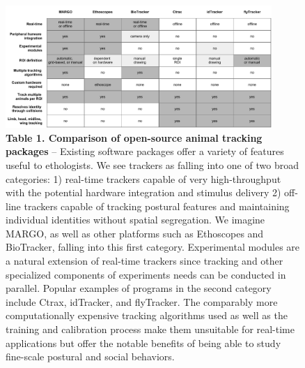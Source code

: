 \documentclass[10pt]{article}
\begin{document}
\newpage
\begin{figure}[t!]
	\begin{center}
		\vspace*{-8cm}
		\includegraphics[width=0.9\textwidth]{../figures/platform_comparison_table.pdf}
	\end{center}
	\caption*{\footnotesize \textbf{Table 1. Comparison of open-source animal tracking packages} -- Existing software packages offer a variety of features useful to ethologists. We see trackers as falling into one of two broad categories: 1) real-time trackers capable of very high-throughput with the potential hardware integration and stimulus delivery 2) off-line trackers capable of tracking postural features and maintaining individual identities without spatial segregation. We imagine MARGO, as well as other platforms such as Ethoscopes and BioTracker, falling into this first category. Experimental modules are a natural extension of real-time trackers since tracking and other specialized components of experiments needs can be conducted in parallel. Popular examples of programs in the second category include Ctrax, idTracker, and flyTracker. The comparably more computationally expensive tracking algorithms used as well as the training and calibration process make them unsuitable for real-time applications but offer the notable benefits of being able to study fine-scale postural and social behaviors.}
\end{figure}
\end{document}
